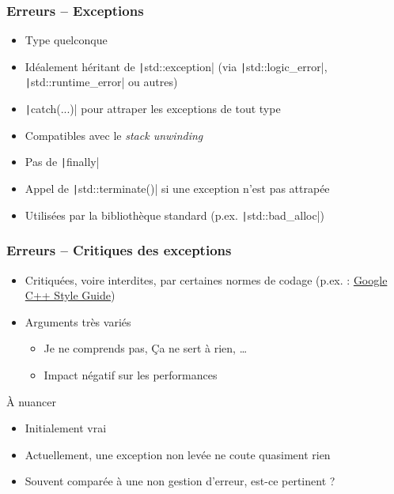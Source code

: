 \documentclass[C++.tex]{subfiles}
\begin{document}
\begin{frame}[fragile]
	\frametitle{Erreurs -- Exceptions}
	\begin{itemize}
		\item Type quelconque
		\item Idéalement héritant de \texttt|std::exception| (via \texttt|std::logic_error|, \texttt|std::runtime_error| ou autres)
		\item \texttt|catch(...)| pour attraper les exceptions de tout type
		\item Compatibles avec le \textit{stack unwinding}


		\item Pas de \texttt|finally|
		\item Appel de \texttt|std::terminate()| si une exception n'est pas attrapée


		\item Utilisées par la bibliothèque standard (p.ex. \texttt|std::bad_alloc|)
	\end{itemize}
\end{frame}

\begin{frame}[fragile]
	\frametitle{Erreurs -- Critiques des exceptions}
	\begin{itemize}
		\item Critiquées, voire interdites, par certaines normes de codage (p.ex. : \href{https://google.github.io/styleguide/cppguide.html}{Google C++ Style Guide\linklogo})
		\item Arguments très variés
		\begin{itemize}
			\item \og Je ne comprends pas\fg{}, \og Ça ne sert à rien\fg{}, \ldots{}
			\item Impact négatif sur les performances
		\end{itemize}
	\end{itemize}

	\begin{block}{À nuancer}
		\begin{itemize}
			\item Initialement vrai
			\item Actuellement, une exception non levée ne coute quasiment rien
			\item Souvent comparée à une non gestion d'erreur, est-ce pertinent ? 
		\end{itemize}
	\end{block}
\end{frame}
\end{document}
